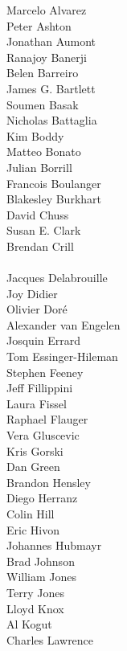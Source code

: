 \documentclass[PICOReport.tex]{subfiles}
\begin{document}
\footnotesize {

\begin{multicols}{4}
Marcelo Alvarez \\
Peter Ashton    \\
Jonathan Aumont \\
Ranajoy Banerji \\
Belen Barreiro  \\
James G. Bartlett  \\
Soumen Basak    \\
Nicholas Battaglia    \\
Kim Boddy    \\
Matteo Bonato    \\
Julian Borrill    \\
Francois Boulanger    \\
Blakesley Burkhart    \\
David Chuss    \\
Susan E. Clark    \\
Brendan Crill    \\    \\
Jacques Delabrouille    \\
Joy Didier    \\
Olivier Dor\'e    \\
Alexander van Engelen    \\
Josquin Errard    \\
Tom Essinger-Hileman    \\
Stephen Feeney    \\
Jeff Fillippini    \\
Laura Fissel    \\
Raphael Flauger    \\
Vera Gluscevic    \\
Kris Gorski    \\
Dan Green    \\
Brandon Hensley    \\
Diego Herranz    \\
Colin Hill    \\
Eric Hivon    \\
Johannes Hubmayr    \\
Brad Johnson    \\
William Jones    \\
Terry Jones    \\
Lloyd Knox    \\
Al Kogut    \\
Charles Lawrence    \\

\end{multicols}}
\end{document}

